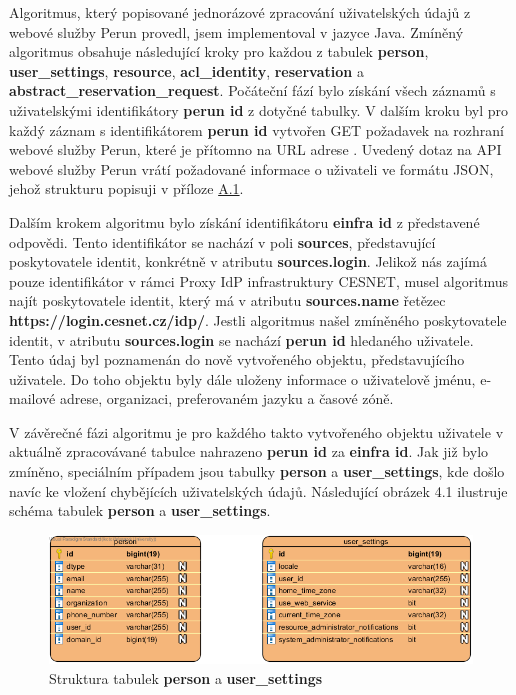 \documentclass[
  printed, %
  twoside, %
  table,   %
  nolof,     %
  nolot,     %
]{fithesis3}
\begin{document}
Algoritmus, který popisované jednorázové zpracování uživatelských údajů z webové služby Perun provedl, jsem implementoval v jazyce Java. Zmíněný algoritmus obsahuje následující kroky pro každou z tabulek \textbf{person}, \textbf{user\_settings}, \textbf{resource}, \textbf{acl\_identity}, \textbf{reservation} a \textbf{abstract\_reservation\_request}. Počáteční fází bylo získání všech záznamů s uživatelskými identifikátory \textbf{perun id} z dotyčné tabulky. V dalším kroku byl pro každý záznam s identifikátorem \textbf{perun id} vytvořen GET požadavek na rozhraní webové služby Perun, které je přítomno na URL adrese . Uvedený dotaz na API webové služby Perun vrátí požadované informace o uživateli ve formátu JSON, jehož strukturu popisuji v příloze \hyperref[table:perunws:user]{A.1}.

\par

Dalším krokem algoritmu bylo získání identifikátoru \textbf{einfra id} z představené odpovědi. Tento identifikátor se nachází v poli \textbf{sources}, představující poskytovatele identit, konkrétně v atributu \textbf{sources.login}. Jelikož nás zajímá pouze identifikátor v rámci Proxy IdP infrastruktury CESNET, musel algoritmus najít poskytovatele identit, který má v atributu \textbf{sources.name} řetězec \textbf{https://login.cesnet.cz/idp/}. Jestli algoritmus našel zmíněného poskytovatele identit, v atributu \textbf{sources.login} se nachází \textbf{perun id} hledaného uživatele. Tento údaj byl poznamenán do nově vytvořeného objektu, představujícího uživatele. Do toho objektu byly dále uloženy informace o uživatelově jménu, e-mailové adrese, organizaci, preferovaném jazyku a časové zóně. 

\par

V závěrečné fázi algoritmu je pro každého takto vytvořeného objektu uživatele v aktuálně zpracovávané tabulce nahrazeno \textbf{perun id} za \textbf{einfra id}. Jak již bylo zmíněno, speciálním případem jsou tabulky \textbf{person} a \textbf{user\_settings}, kde došlo navíc ke vložení chybějících uživatelských údajů. Následující obrázek 4.1 ilustruje schéma tabulek \textbf{person} a \textbf{user\_settings}. 

\begin{figure}[H]
\label{fig:erd-person-user-settings}
\caption{Struktura tabulek \textbf{person} a \textbf{user\_settings}}
\centering
\includegraphics[width=12.8cm]{pics/erd-person-user_settings} 
\end{figure}
\par 
\end{document}
